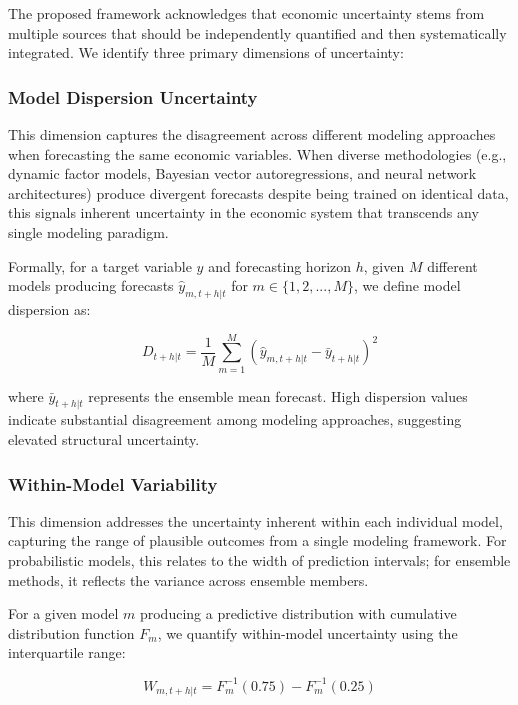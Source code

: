 \documentclass[5p,authoryear]{elsarticle}
\begin{document}
The proposed framework acknowledges that economic uncertainty stems from multiple sources that should be independently quantified and then systematically integrated. We identify three primary dimensions of uncertainty:

\subsubsection{Model Dispersion Uncertainty}

This dimension captures the disagreement across different modeling approaches when forecasting the same economic variables. When diverse methodologies (e.g., dynamic factor models, Bayesian vector autoregressions, and neural network architectures) produce divergent forecasts despite being trained on identical data, this signals inherent uncertainty in the economic system that transcends any single modeling paradigm.

Formally, for a target variable $y$ and forecasting horizon $h$, given $M$ different models producing forecasts $\hat{y}_{m,t+h|t}$ for $m \in \{1,2,...,M\}$, we define model dispersion as:

\begin{equation}
D_{t+h|t} = \frac{1}{M} \sum_{m=1}^{M} (\hat{y}_{m,t+h|t} - \bar{y}_{t+h|t})^2
\end{equation}

where $\bar{y}_{t+h|t}$ represents the ensemble mean forecast. High dispersion values indicate substantial disagreement among modeling approaches, suggesting elevated structural uncertainty.

\subsubsection{Within-Model Variability}

This dimension addresses the uncertainty inherent within each individual model, capturing the range of plausible outcomes from a single modeling framework. For probabilistic models, this relates to the width of prediction intervals; for ensemble methods, it reflects the variance across ensemble members.

For a given model $m$ producing a predictive distribution with cumulative distribution function $F_m$, we quantify within-model uncertainty using the interquartile range:

\begin{equation}
W_{m,t+h|t} = F_m^{-1}(0.75) - F_m^{-1}(0.25)
\end{equation}
\end{document}
